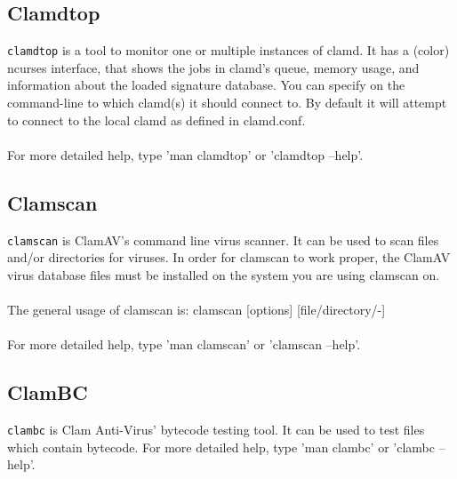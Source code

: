\documentclass[a4paper,titlepage,12pt]{article}
\begin{document}
    \subsection{Clamdtop}
    \verb+clamdtop+ is a tool to monitor one or multiple instances of clamd.  It
    has a (color) ncurses interface, that shows the jobs in clamd's queue,
    memory usage, and information about the loaded signature database.
    You can specify on the command-line to which clamd(s) it should connect
    to. By default it will attempt to connect to the local clamd as defined
    in clamd.conf.
    \\\\
    For more detailed help, type 'man clamdtop' or 'clamdtop --help'.

    \subsection{Clamscan}
    \verb+clamscan+ is ClamAV's command line virus scanner.  It can be used to
    scan files and/or directories for viruses.  In order for clamscan
    to work proper, the ClamAV virus database files must be installed on
    the system you are using clamscan on.
    \\\\
    The general usage of clamscan is: clamscan [options] [file/directory/-]
    \\\\
    For more detailed help, type 'man clamscan' or 'clamscan --help'.

    \subsection{ClamBC}
    \verb+clambc+ is Clam Anti-Virus' bytecode testing tool.  It can be
    used to test files which contain bytecode. For more detailed help,
    type 'man clambc' or 'clambc --help'.
\end{document}
